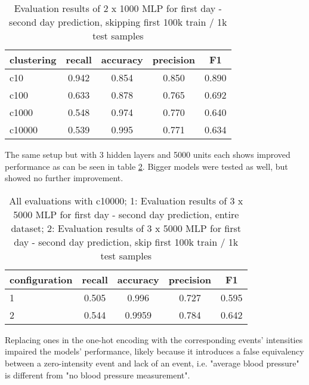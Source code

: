 \begin{table}[H]
  \centering
    \begin{tabular}{lcccc} \toprule
        {clustering} & {recall} & {accuracy} & {precision} & {F1}  \\ \midrule
        {c10}  & 0.942  & 0.854 & 0.850  &  0.890 \\ 
        {c100}  & 0.633  & 0.878 & 0.765  &  0.692 \\ 
        {c1000}  & 0.548  & 0.974 & 0.770  &  0.640 \\ 
        {c10000}  &  0.539  & 0.995 & 0.771  &  0.634 \\ \midrule
        
    \end{tabular}
  \caption{Evaluation results of 2 x 1000 MLP for first day - second day  prediction, skipping first 100k train / 1k test samples}  \label{tab:mytable1}
\end{table}


The same setup but with 3 hidden layers and 5000 units each shows improved performance as can be seen in table \ref{tab:mytable3}. Bigger models were tested as well, but showed no further improvement.


\begin{table}[H]
  \centering
    \begin{tabular}{lcccc} \toprule
        {configuration} & {recall} & {accuracy} & {precision} & {F1}  \\ \midrule
        {1}  & 0.505  & 0.996 &  0.727  & 0.595 \\
        {2} & 0.544  & 0.9959 &  0.784  & 0.642 \\  \midrule
    \end{tabular}
  \caption{All evaluations with c10000; 1: Evaluation results of 3 x 5000 MLP for first day - second day  prediction, entire dataset; 2: Evaluation results of 3 x 5000 MLP for first day - second day prediction, skip first 100k train / 1k test samples}
  \label{tab:mytable3}
\end{table}




Replacing ones in the one-hot encoding with the corresponding events' intensities impaired the models' performance, likely because it introduces a false equivalency between a zero-intensity event and lack of an event, i.e. "average blood pressure" is different from "no blood pressure measurement".